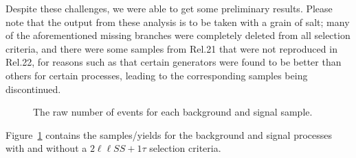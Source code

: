         Despite these challenges, we were able to get some preliminary results. Please note that the output from these analysis is to be taken with a grain of salt; many of the aforementioned missing branches were completely deleted from all selection criteria, and there were some samples from Rel.21 that were not reproduced in Rel.22, for reasons such as that certain generators were found to be better than others for certain processes, leading to the corresponding samples being discontinued.


        \begin{figure}[t]
            \centering
            
            \caption{The raw number of events for each background and signal sample.}
            \label{PreFitPlots}
        \end{figure}


        Figure~\ref{PreFitPlots} contains the samples/yields for the background and signal processes with and without a $2\ell\ell SS + 1\tau$ selection criteria.